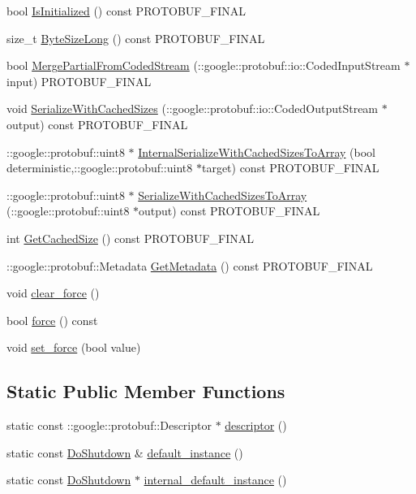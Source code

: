 \begin{DoxyCompactItemize}
bool \hyperlink{class_do_shutdown_a1a202ffa75c33eac706f04eb501d1089}{Is\+Initialized} () const P\+R\+O\+T\+O\+B\+U\+F\+\_\+\+F\+I\+N\+AL
\item 
size\+\_\+t \hyperlink{class_do_shutdown_a36e573c232da258498228579141190aa}{Byte\+Size\+Long} () const P\+R\+O\+T\+O\+B\+U\+F\+\_\+\+F\+I\+N\+AL
\item 
bool \hyperlink{class_do_shutdown_adc9b83c923b2e4bb8b843f7400f1d3e1}{Merge\+Partial\+From\+Coded\+Stream} (\+::google\+::protobuf\+::io\+::\+Coded\+Input\+Stream $\ast$input) P\+R\+O\+T\+O\+B\+U\+F\+\_\+\+F\+I\+N\+AL
\item 
void \hyperlink{class_do_shutdown_aea724703f66a2e7af297d10af1d4e0c5}{Serialize\+With\+Cached\+Sizes} (\+::google\+::protobuf\+::io\+::\+Coded\+Output\+Stream $\ast$output) const P\+R\+O\+T\+O\+B\+U\+F\+\_\+\+F\+I\+N\+AL
\item 
\+::google\+::protobuf\+::uint8 $\ast$ \hyperlink{class_do_shutdown_a41be0c5e3ff0bf16f15e0bab33fe2bb2}{Internal\+Serialize\+With\+Cached\+Sizes\+To\+Array} (bool deterministic,\+::google\+::protobuf\+::uint8 $\ast$target) const P\+R\+O\+T\+O\+B\+U\+F\+\_\+\+F\+I\+N\+AL
\item 
\+::google\+::protobuf\+::uint8 $\ast$ \hyperlink{class_do_shutdown_a0ad12d5aaf4613fad5819b2dea94186b}{Serialize\+With\+Cached\+Sizes\+To\+Array} (\+::google\+::protobuf\+::uint8 $\ast$output) const P\+R\+O\+T\+O\+B\+U\+F\+\_\+\+F\+I\+N\+AL
\item 
int \hyperlink{class_do_shutdown_a777d4dd7d704d95ccc6602504aca1bef}{Get\+Cached\+Size} () const P\+R\+O\+T\+O\+B\+U\+F\+\_\+\+F\+I\+N\+AL
\item 
\+::google\+::protobuf\+::\+Metadata \hyperlink{class_do_shutdown_afdf336a80f04202a41dc30c877f4387a}{Get\+Metadata} () const P\+R\+O\+T\+O\+B\+U\+F\+\_\+\+F\+I\+N\+AL
\item 
void \hyperlink{class_do_shutdown_adb04131ab945007f6a26dd354cda5646}{clear\+\_\+force} ()
\item 
bool \hyperlink{class_do_shutdown_ae470392499921248bf6c46c58d233f6d}{force} () const 
\item 
void \hyperlink{class_do_shutdown_ae7fa2e4d96746b439cfad473a0ec2192}{set\+\_\+force} (bool value)
\end{DoxyCompactItemize}
\subsection*{Static Public Member Functions}
\begin{DoxyCompactItemize}
\item 
static const \+::google\+::protobuf\+::\+Descriptor $\ast$ \hyperlink{class_do_shutdown_a61d5d64fc5fc0961878a4a21536a5318}{descriptor} ()
\item 
static const \hyperlink{class_do_shutdown}{Do\+Shutdown} \& \hyperlink{class_do_shutdown_a91bbc47476d16a7f942b6a739ba55c95}{default\+\_\+instance} ()
\item 
static const \hyperlink{class_do_shutdown}{Do\+Shutdown} $\ast$ \hyperlink{class_do_shutdown_ab0bbc935fc413a234f1db826b6e51f00}{internal\+\_\+default\+\_\+instance} ()
\end{DoxyCompactItemize}
